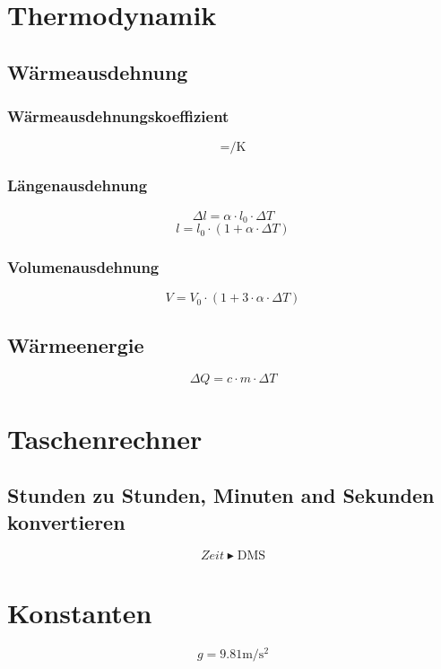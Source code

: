 \documentclass[a4paper]{IEEEtran}
\begin{document}
  \section{Thermodynamik}
  \subsection{Wärmeausdehnung}
  \subsubsection{Wärmeausdehnungskoeffizient}
  \begin{equation}
    [\alpha] = \si{\per\kelvin}
  \end{equation}
  \subsubsection{Längenausdehnung}
  \begin{equation}
    \Delta l = \alpha \cdot l_0 \cdot \Delta T
  \end{equation}
  \begin{equation}
    l = l_0 \cdot (1 + \alpha \cdot \Delta T)
  \end{equation}
  \subsubsection{Volumenausdehnung}
  \begin{equation}
    V = V_0 \cdot (1 + 3 \cdot \alpha \cdot \Delta T)
  \end{equation}

  \subsection{Wärmeenergie}
  \begin{equation}
    \Delta Q = c \cdot m \cdot \Delta T
  \end{equation}  

  \section{Taschenrechner}
  \subsection{Stunden zu Stunden, Minuten and Sekunden konvertieren}
  \begin{equation}
    Zeit \blacktriangleright \mbox{DMS}
  \end{equation}

  \section{Konstanten}
  \begin{equation}
    g = 9.81 \si{\metre\per\square\second}
  \end{equation}
\end{document}
